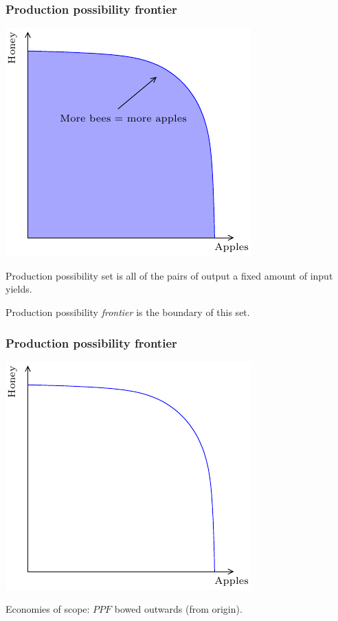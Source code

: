 \documentclass[xcolor=pdftex,dvipsnames]{beamer}
\begin{document}
\begin{frame}
\frametitle{Production possibility frontier}
\begin{center}
\includegraphics{pics/PPF1}
\end{center}
Production possibility set is all of the pairs of output a fixed
amount of input yields.
\bigskip

Production possibility \emph{frontier} is the boundary of this set.
\end{frame}

\begin{frame}
\frametitle{Production possibility frontier}
\begin{center}
\includegraphics{pics/PPF2}
\end{center}


Economies of scope: $PPF$ bowed outwards (from origin). 
\end{frame}
\end{document}
